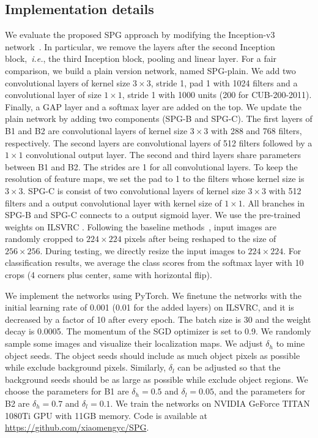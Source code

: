 \documentclass[runningheads]{llncs}
\newcommand{\ie}{\emph{i.e.}}
\begin{document}
\subsection{Implementation details}
We evaluate the proposed SPG approach by modifying the Inception-v3 network~\cite{szegedy2016rethinking}.
In particular, we remove the layers after the second Inception block,~\ie, the third Inception block, pooling and linear layer.
For a fair comparison, we build a plain version network, named SPG-plain.
We add two convolutional layers of kernel size $3 \times 3$, stride 1, pad 1 with 1024 filters and a convolutional layer of size $1 \times 1$, stride 1 with 1000 units (200 for CUB-200-2011).
Finally, a GAP layer and a softmax layer are added on the top.
We update the plain network by adding two components (SPG-B and SPG-C).
The first layers of B1 and B2 are convolutional layers of kernel size $3 \times 3$ with 288 and 768 filters, respectively.
The second layers are convolutional layers of 512 filters followed by a $1 \times 1$ convolutional output layer.
The second and third layers share parameters between B1 and B2.
The strides are 1 for all convolutional layers.
To keep the resolution of feature maps, we set the pad to 1 to the filters whose kernel size is $3 \times 3$.
SPG-C is consist of two convolutional layers of kernel size $3 \times 3$ with 512 filters and a output convolutional layer with kernel size of $1 \times 1$.
All branches in SPG-B and SPG-C connects to a output sigmoid layer.
We use the pre-trained weights on ILSVRC \cite{ILSVRC15}.
Following the baseline methods~\cite{zhou2015cnnlocalization,singh2017hide}, input images are randomly cropped to $224 \times 224$ pixels after being reshaped to the size of $256 \times 256$.
During testing, we directly resize the input images to $224 \times 224$.
For classification results, we average the class scores from the softmax layer with 10 crops (4 corners plus center, same with horizontal flip).

We implement the networks using PyTorch.
We finetune the networks with the initial learning rate of 0.001 (0.01 for the added layers) on ILSVRC,
and it is decreased by a factor of 10 after every epoch.
The batch size is 30 and the weight decay is 0.0005. The momentum of the SGD optimizer is set to 0.9.
We randomly sample some images and visualize their localization maps.
We adjust $\delta_h$ to mine object seeds.
The object seeds should include as much object pixels as possible while exclude background pixels.
Similarly, $\delta_l$ can be adjusted so that the background seeds should be as large as possible while exclude object regions.
We choose the parameters for B1 are $\delta_h=0.5$ and $\delta_l=0.05$, and the parameters for B2 are $\delta_h=0.7$ and $\delta_l=0.1$.
We train the networks on NVIDIA GeForce TITAN 1080Ti GPU with 11GB memory.
Code is available at \url{https://github.com/xiaomengyc/SPG}.
\end{document}
